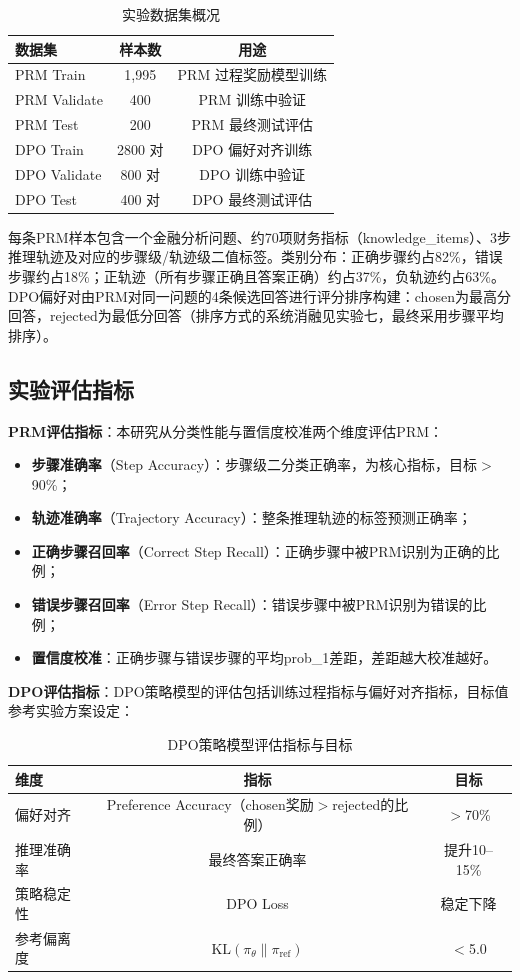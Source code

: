 \documentclass[professional,privacy,print,win,long,STEM,AutoFakeBold]{def/buaa}
\begin{document}
\begin{table}[h]
\centering
\caption{实验数据集概况}
\label{tab:dataset}
\begin{tabular}{lcc}
\toprule
数据集 & 样本数 & 用途 \\
\midrule
PRM Train & 1,995 & PRM 过程奖励模型训练 \\
PRM Validate & 400 & PRM 训练中验证 \\
PRM Test & 200 & PRM 最终测试评估 \\
DPO Train & 2800 对 & DPO 偏好对齐训练 \\
DPO Validate & 800 对 & DPO 训练中验证 \\
DPO Test & 400 对 & DPO 最终测试评估 \\
\bottomrule
\end{tabular}
\end{table}

每条PRM样本包含一个金融分析问题、约70项财务指标（knowledge\_items）、3步推理轨迹及对应的步骤级/轨迹级二值标签。类别分布：正确步骤约占82\%，错误步骤约占18\%；正轨迹（所有步骤正确且答案正确）约占37\%，负轨迹约占63\%。DPO偏好对由PRM对同一问题的4条候选回答进行评分排序构建：chosen为最高分回答，rejected为最低分回答（排序方式的系统消融见实验七，最终采用步骤平均排序）。

\subsection{实验评估指标}

\textbf{PRM评估指标}：本研究从分类性能与置信度校准两个维度评估PRM：

\begin{itemize}
    \item \textbf{步骤准确率}（Step Accuracy）：步骤级二分类正确率，为核心指标，目标$>$90\%；
    \item \textbf{轨迹准确率}（Trajectory Accuracy）：整条推理轨迹的标签预测正确率；
    \item \textbf{正确步骤召回率}（Correct Step Recall）：正确步骤中被PRM识别为正确的比例；
    \item \textbf{错误步骤召回率}（Error Step Recall）：错误步骤中被PRM识别为错误的比例；
    \item \textbf{置信度校准}：正确步骤与错误步骤的平均prob\_1差距，差距越大校准越好。
\end{itemize}

\textbf{DPO评估指标}：DPO策略模型的评估包括训练过程指标与偏好对齐指标，目标值参考实验方案设定：

\begin{table}[h]
\centering
\caption{DPO策略模型评估指标与目标}
\label{tab:dpo-metrics}
\begin{tabular}{lcc}
\toprule
维度 & 指标 & 目标 \\
\midrule
偏好对齐 & Preference Accuracy（chosen奖励$>$rejected的比例） & $>$70\% \\
推理准确率 & 最终答案正确率 & 提升10--15\% \\
策略稳定性 & DPO Loss & 稳定下降 \\
参考偏离度 & $\text{KL}(\pi_\theta \| \pi_{\text{ref}})$ & $<$5.0 \\
\bottomrule
\end{tabular}
\end{table}
\end{document}

